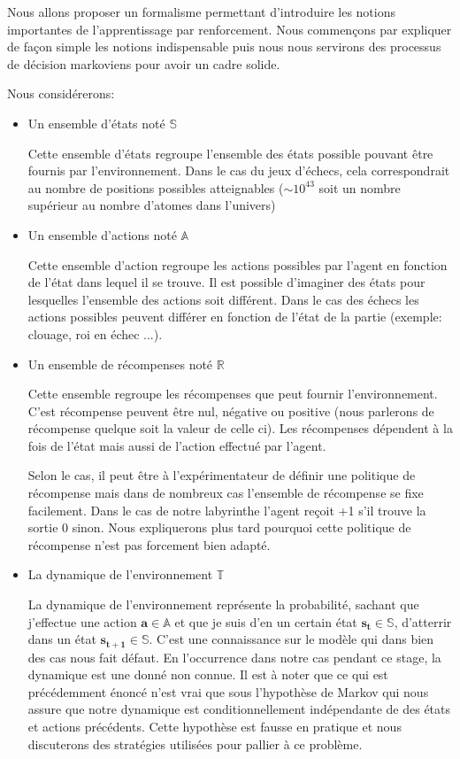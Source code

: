 Nous allons proposer un formalisme  permettant d'introduire les notions importantes de l'apprentissage par renforcement. Nous commençons par expliquer de façon simple les notions indispensable puis nous nous servirons des processus de décision markoviens pour avoir un cadre solide.

Nous considérerons: 

\begin{itemize}
    \item Un ensemble d'états noté $\bm{\mathbb{S}}$
    
    Cette ensemble d'états regroupe l'ensemble des états possible pouvant être fournis par l'environnement. Dans le cas du jeux d'échecs, cela correspondrait au nombre de positions possibles atteignables ($\sim 10^{43}$ soit un nombre supérieur au nombre d'atomes dans l'univers)
    
    \item Un ensemble d'actions noté $\bm{\mathbb{A}}$
    
    Cette ensemble d'action regroupe les actions possibles par l'agent en fonction de l'état dans lequel il se trouve. Il est possible d'imaginer des états pour lesquelles l'ensemble des actions soit différent. Dans le cas des échecs les actions possibles peuvent différer en fonction de l'état de la partie (exemple: clouage, roi en échec ...).

    \item Un ensemble de récompenses noté $\bm{\mathbb{R}}$
    
    Cette ensemble regroupe les récompenses que peut fournir l'environnement. C'est récompense peuvent être nul, négative ou positive (nous parlerons de récompense quelque soit la valeur de celle ci). Les récompenses dépendent à la fois de l'état mais aussi de l'action effectué par l'agent.
    
    Selon le cas, il peut être à l'expérimentateur de définir une politique de récompense mais dans de nombreux cas l'ensemble de récompense se fixe facilement. Dans le cas de notre labyrinthe l'agent reçoit +1 s'il trouve la sortie 0 sinon. Nous expliquerons plus tard pourquoi cette politique de récompense n'est pas forcement bien adapté.
    
    \item La dynamique de l'environnement $\bm{\mathbb{T}}$
    
    La dynamique de l'environnement représente la probabilité, sachant que j'effectue une action $\bm{a \in \mathbb{A}}$ et que je suis d'en un certain état $\bm{s_t \in \mathbb{S}}$, d'atterrir dans un état  $\bm{s_{t+1} \in \mathbb{S}}$. C'est une connaissance sur le modèle qui dans bien des cas nous fait défaut. En l'occurrence dans notre cas pendant ce stage, la dynamique est une donné non connue. Il est à noter que ce qui est précédemment énoncé n'est vrai que sous l'hypothèse de Markov qui nous assure que notre dynamique est conditionnellement indépendante de  des états et actions précédents. Cette hypothèse est fausse en pratique et nous discuterons des stratégies utilisées pour pallier à ce problème. 
    

\end{itemize}
